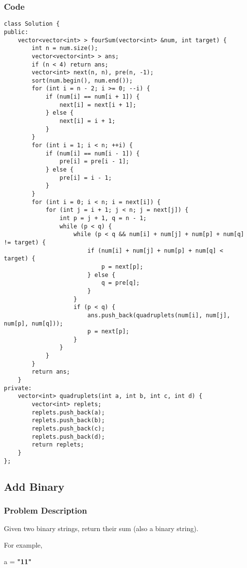 \documentclass{article}
\begin{document}
\begin{CJK*}{UTF8}{gkai}
\subsubsection*{Code}
\begin{lstlisting}
class Solution {
public:
    vector<vector<int> > fourSum(vector<int> &num, int target) {
        int n = num.size();
        vector<vector<int> > ans;
        if (n < 4) return ans;
        vector<int> next(n, n), pre(n, -1);
        sort(num.begin(), num.end());
        for (int i = n - 2; i >= 0; --i) {
            if (num[i] == num[i + 1]) {
                next[i] = next[i + 1];
            } else {
                next[i] = i + 1;
            }
        }
        for (int i = 1; i < n; ++i) {
            if (num[i] == num[i - 1]) {
                pre[i] = pre[i - 1];
            } else {
                pre[i] = i - 1;
            }
        }
        for (int i = 0; i < n; i = next[i]) {
            for (int j = i + 1; j < n; j = next[j]) {
                int p = j + 1, q = n - 1;
                while (p < q) {
                    while (p < q && num[i] + num[j] + num[p] + num[q] != target) {
                        if (num[i] + num[j] + num[p] + num[q] < target) {
                            p = next[p];
                        } else {
                            q = pre[q];
                        }
                    }
                    if (p < q) {
                        ans.push_back(quadruplets(num[i], num[j], num[p], num[q]));
                        p = next[p];
                    }
                }
            }
        }
        return ans;
    }
private:
    vector<int> quadruplets(int a, int b, int c, int d) {
        vector<int> replets;
        replets.push_back(a);
        replets.push_back(b);
        replets.push_back(c);
        replets.push_back(d);
        return replets;
    }
}; 
\end{lstlisting}


\subsection{ Add Binary }
\label{ Add Binary }

\subsubsection*{Problem Description}
Given two binary strings, return their sum (also a binary string).

For example,


a = \textbf{"11"}



\end{CJK*}
\end{document}
